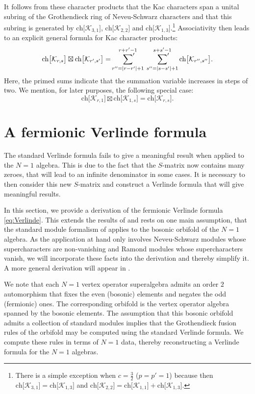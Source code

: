 \documentclass[a4paper,reqno,12pt]{report}
\theoremstyle{definition}
\numberwithin{equation}{section}
\let\originalleft\left     %
\let\originalright\right
\renewcommand{\left}{\mathopen{}\mathclose\bgroup\originalleft}
\renewcommand{\right}{\aftergroup\egroup\originalright}
\newcommand{\abs}[1]{\left\lvert #1 \right\rvert}
\newcommand{\Kac}[1]{\mathcal{K}_{#1}}       %
\newcommand{\chmap}{\mathrm{ch}}
\newcommand{\Gr}[1]{\bigl[ #1 \bigr]}            %
\newcommand{\ch}[1]{\chmap \Gr{#1}}              %
\newcommand{\Grfuse}{\mathbin{\boxtimes}}                                       %
\newcommand{\ns}{Neveu-Schwarz}
\theoremstyle{plain}
\begin{document}
It follows from these character products that the Kac characters span a unital subring of the Grothendieck ring of \ns{} characters and that this subring is generated by $\ch{\Kac{3,1}}$, $\ch{\Kac{2,2}}$ and $\ch{\Kac{1,3}}$.\footnote{There is a simple exception when $c=\frac{3}{2}$ ($p=p'=1$) because then $\ch{\Kac{3,1}} = \ch{\Kac{1,3}}$ and $\ch{\Kac{2,2}} = \ch{\Kac{1,1}} + \ch{\Kac{1,3}}$.}  Associativity then leads to an explicit general formula for Kac character products:
\begin{equation} \label{GrFR:KxK}
\ch{\Kac{r,s}} \Grfuse \ch{\Kac{r',s'}} = \sideset{}{'} \sum_{r'' = \abs{r-r'}+1}^{r+r'-1} \ \sideset{}{'} \sum_{s'' = \abs{s-s'}+1}^{s+s'-1} \ch{\Kac{r'',s''}}.
\end{equation}
Here, the primed sums indicate that the summation variable increases in steps of two.  We mention, for later purposes, the following special case:
\begin{equation} \label{GrFR:Kr1xK1s}
\ch{\Kac{r,1}} \Grfuse \ch{\Kac{1,s}} = \ch{\Kac{r,s}}.
\end{equation}

\section{A fermionic Verlinde formula} \label{sec:FermVer}

The standard Verlinde formula fails to give a meaningful result when applied to the $N=1$ algebra. This is due to the fact that the $S$-matrix now contains many zeroes, that will lead to an infinite denominator in some cases. It is necessary to then consider this new $S$-matrix and construct a Verlinde formula that will give meaningful results.

In this section, we provide a derivation of the fermionic Verlinde formula \eqref{eq:Verlinde}.  This extends the results of \cite{EhoFus94} and rests on one main assumption, that the standard module formalism of \cite{CreLog13,RidVer14} applies to the bosonic orbifold of the $N=1$ algebra.  As the application at hand only involves \ns{} modules whose supercharacters are non-vanishing and Ramond modules whose supercharacters vanish, we will incorporate these facts into the derivation and thereby simplify it.  A more general derivation will appear in \cite{MelVer15}.

We note that each $N=1$ vertex operator superalgebra admits an order $2$ automorphism that fixes the even (bosonic) elements and negates the odd (fermionic) ones.  The corresponding orbifold is the vertex operator algebra spanned by the bosonic elements.  The assumption that this bosonic orbifold admits a collection of standard modules implies that the Grothendieck fusion rules of the orbifold may be computed using the standard Verlinde formula.  We compute these rules in terms of $N=1$ data, thereby reconstructing a Verlinde formula for the $N=1$ algebras.
\end{document}
